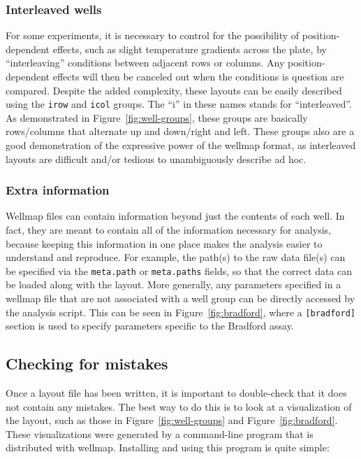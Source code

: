 \documentclass[twocolumn]{bmcart}
\begin{document}
\subsubsection*{Interleaved wells}

For some experiments, it is necessary to control for the possibility
of position-dependent effects, such as slight temperature gradients
across the plate, by ``interleaving'' conditions between adjacent
rows or columns. Any position-dependent effects will then be canceled
out when the conditions is question are compared. Despite the added
complexity, these layouts can be easily described using the \texttt{irow}
and \texttt{icol} groups. The ``i'' in these names stands for ``interleaved''.
As demonstrated in Figure~\ref{fig:well-groups}, these groups are
basically rows/columns that alternate up and down/right and left.
These groups also are a good demonstration of the expressive power
of the wellmap format, as interleaved layouts are difficult and/or
tedious to unambiguously describe ad hoc.

\subsubsection*{Extra information}

Wellmap files can contain information beyond just the contents of
each well. In fact, they are meant to contain all of the information
necessary for analysis, because keeping this information in one place
makes the analysis easier to understand and reproduce. For example,
the path(s) to the raw data file(s) can be specified via the \texttt{meta.path}
or \texttt{meta.paths} fields, so that the correct data can be loaded
along with the layout. More generally, any parameters specified in
a wellmap file that are not associated with a well group can be directly
accessed by the analysis script. This can be seen in Figure~\ref{fig:bradford},
where a \texttt{{[}bradford{]}} section is used to specify parameters
specific to the Bradford assay.

\subsection*{Checking for mistakes}

Once a layout file has been written, it is important to double-check
that it does not contain any mistakes. The best way to do this is
to look at a visualization of the layout, such as those in Figure~\ref{fig:well-groups}
and Figure~\ref{fig:bradford}. These visualizations were generated
by a command-line program that is distributed with wellmap. Installing
and using this program is quite simple:
\end{document}

